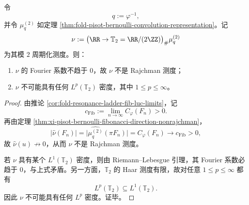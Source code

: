 \begin{corollary}\label{cor:xi-time-part66-periodized-bernoulli-nonrajchman-no-lp}
令
\[
q:=\varphi^{-1},
\]
并令 \(\mu_q^{(2)}\) 如定理 \ref{thm:fold-pisot-bernoulli-convolution-representation}。记
\[
\nu:=\bigl(\RR\to \mathbb T_2=\RR/(2\ZZ)\bigr)_\#\mu_q^{(2)}
\]
为其模 \(2\) 周期化测度。则：
\begin{enumerate}
  \item \(\nu\) 的 Fourier 系数不趋于 \(0\)，故 \(\nu\) 不是 Rajchman 测度；
  \item \(\nu\) 不可能具有任何 \(L^p(\mathbb T_2)\) 密度，其中 \(1\le p\le \infty\)。
\end{enumerate}
\end{corollary}
\begin{proof}
由推论 \ref{cor:fold-resonance-ladder-fib-luc-limits}，记
\[
c_{\mathrm{Fib}}:=\lim_{n\to\infty}C_\varphi(F_n)>0.
\]
再由定理 \ref{thm:xi-pisot-bernoulli-fibonacci-direction-nonrajchman}，
\[
\bigl|\widehat\nu(F_n)\bigr|
=
\bigl|\widehat{\mu_q^{(2)}}(\pi F_n)\bigr|
=
C_\varphi(F_n)
\longrightarrow
c_{\mathrm{Fib}}>0,
\]
故 \(\widehat\nu(u)\not\to 0\)，从而 \(\nu\) 不是 Rajchman 测度。

若 \(\nu\) 具有某个 \(L^1(\mathbb T_2)\) 密度，则由 Riemann--Lebesgue 引理，其 Fourier 系数必趋于 \(0\)，与上式矛盾。另一方面，\(\mathbb T_2\) 的 Haar 测度有限，故对任意 \(1\le p\le\infty\) 都有
\[
L^p(\mathbb T_2)\subseteq L^1(\mathbb T_2).
\]
因此 \(\nu\) 不可能具有任何 \(L^p\) 密度。证毕。
\end{proof}

